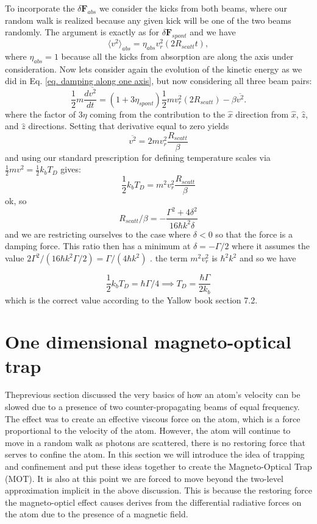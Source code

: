 \documentclass[../../main.tex]{subfiles}
\begin{document}
To incorporate the $\delta\mathbf{F}_{abs}$ we consider the kicks from both beams, where our random walk is realized because any given kick will be one of the two beams randomly. The argument is exactly as for $\delta\mathbf{F}_{spont}$ and we have 
\begin{equation}
    \langle v^2 \rangle_{abs}=\eta_{abs} v_r^2(2R_{scatt}t),
\end{equation}
where $\eta_{abs}=1$ because all the kicks from absorption are along the axis under consideration. Now lets consider again the evolution of the kinetic energy as we did in Eq. \ref{eq. damping along one axis}, but now considering all three beam pairs:
\begin{equation}\label{eq. doppler cooling balance}
    \frac12 m\frac{d\overline{v^2}}{dt}=(1+3\eta_{spont})\frac12 mv_r^2(2R_{scatt})-\beta\overline{v^2}.
\end{equation}
where the factor of $3\eta$ coming from the contribution to the $\hat{x}$ direction from $\hat{x}$, $\hat{z}$, and $\hat{z}$ directions. Setting that derivative equal to zero yields $$\overline{v^2}=2mv_r^2 \frac{ R_{scatt}}{\beta}$$ and using our standard prescription for defining temperature scales via $\tfrac12 mv^2=\tfrac12 k_bT_D$ gives:
\begin{equation}
    \frac12 k_bT_D=m^2v_r^2\frac{ R_{scatt}}{\beta}
\end{equation}
ok, so 
\begin{equation}
    R_{scatt}/\beta = -\frac{\Gamma^2+4\delta^2}{16\hbar k^2 \delta}
\end{equation}
and we are restricting ourselves to the case where $\delta<0$ so that the force is a damping force. This ratio then has a minimum at $\delta = -\Gamma/2$ where it assumes the value $2\Gamma^2/(16 \hbar k^2 \Gamma/2)=\Gamma/(4\hbar k^2)$ . the term $m^2v_r^2$ is $\hbar^2 k^2$ and so we have

\begin{equation}
    \frac12 k_bT_D=\hbar\Gamma/4 \implies T_D=\frac{\hbar\Gamma}{2k_b}
\end{equation}
which is the correct value according to the Yallow book section 7.2. 

\section{One dimensional magneto-optical trap}
Theprevious section discussed the very basics of how an atom's velocity can be slowed due to a presence of two counter-propagating beams of equal frequency. The effect was to create an effective viscous force on the atom, which is a force proportional to the velocity of the atom. However, the atom will continue to move in a random walk as photons are scattered, there is no restoring force that serves to confine the atom. In this section we will introduce the idea of trapping and confinement and put these ideas together to create the Magneto-Optical Trap (MOT). It is also at this point we are forced to move beyond the two-level approximation implicit in the above discussion. This is because the restoring force the magneto-opticl effect causes derives from the differential radiative forces on the atom due to the presence of a magnetic field. 
\end{document}
